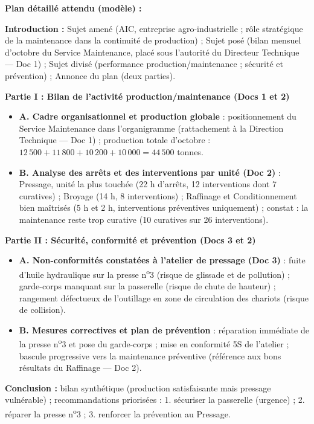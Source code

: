 \documentclass[11pt]{article}
\begin{document}
\begin{corrige}
\textbf{Plan détaillé attendu (modèle) :}

\textbf{Introduction :} Sujet amené (AIC, entreprise agro-industrielle ; rôle stratégique de la maintenance dans la continuité de production) ; Sujet posé (bilan mensuel d'octobre du Service Maintenance, placé sous l'autorité du Directeur Technique — Doc 1) ; Sujet divisé (performance production/maintenance ; sécurité et prévention) ; Annonce du plan (deux parties).

\textbf{Partie I : Bilan de l'activité production/maintenance (Docs 1 et 2)}
\begin{itemize}
    \item \textbf{A. Cadre organisationnel et production globale} : positionnement du Service Maintenance dans l'organigramme (rattachement à la Direction Technique — Doc 1) ; production totale d'octobre : $12\,500 + 11\,800 + 10\,200 + 10\,000 = 44\,500$ tonnes.
    \item \textbf{B. Analyse des arrêts et des interventions par unité (Doc 2)} : Pressage, unité la plus touchée (22 h d'arrêts, 12 interventions dont 7 curatives) ; Broyage (14 h, 8 interventions) ; Raffinage et Conditionnement bien maîtrisés (5 h et 2 h, interventions préventives uniquement) ; constat : la maintenance reste trop curative (10 curatives sur 26 interventions).
\end{itemize}

\textbf{Partie II : Sécurité, conformité et prévention (Docs 3 et 2)}
\begin{itemize}
    \item \textbf{A. Non-conformités constatées à l'atelier de pressage (Doc 3)} : fuite d'huile hydraulique sur la presse n\textsuperscript{o}3 (risque de glissade et de pollution) ; garde-corps manquant sur la passerelle (risque de chute de hauteur) ; rangement défectueux de l'outillage en zone de circulation des chariots (risque de collision).
    \item \textbf{B. Mesures correctives et plan de prévention} : réparation immédiate de la presse n\textsuperscript{o}3 et pose du garde-corps ; mise en conformité 5S de l'atelier ; bascule progressive vers la maintenance préventive (référence aux bons résultats du Raffinage — Doc 2).
\end{itemize}

\textbf{Conclusion :} bilan synthétique (production satisfaisante mais pressage vulnérable) ; recommandations priorisées : 1. sécuriser la passerelle (urgence) ; 2. réparer la presse n\textsuperscript{o}3 ; 3. renforcer la prévention au Pressage.


\end{corrige}
\end{document}
